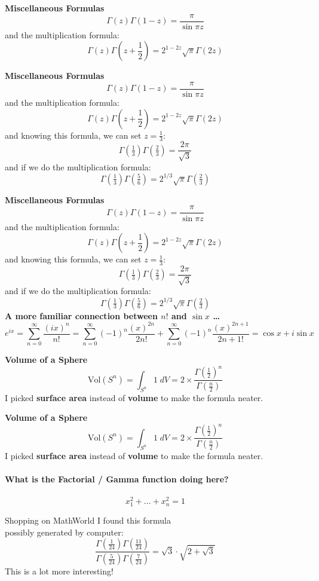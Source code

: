 \documentclass[12pt]{article}
\begin{document}
\newpage

\noindent \textbf{Miscellaneous Formulas}
$$ \Gamma(z) \Gamma(1-z) = \frac{\pi}{\sin \pi z}$$
and the multiplication formula:
$$ \Gamma(z) \Gamma(z+ \frac{1}{2}) = 2^{1-2z} \sqrt{\pi}\Gamma(2z) $$

\newpage

\noindent \textbf{Miscellaneous Formulas}
$$ \Gamma(z) \Gamma(1-z) = \frac{\pi}{\sin \pi z}$$
and the multiplication formula:
$$ \Gamma(z) \Gamma(z+ \frac{1}{2}) = 2^{1-2z} \sqrt{\pi}\Gamma(2z) $$
and knowing this formula, we can set $z = \frac{1}{3}$:
$$ \Gamma(\tfrac{1}{3})\Gamma(\tfrac{2}{3})
= \frac{2\pi}{\sqrt{3}}$$
and if we do the multiplication formula:
$$ \Gamma(\tfrac{1}{3})
\Gamma(\tfrac{5}{6}) = 2^{1/3} \sqrt{\pi} \Gamma(\tfrac{2}{3})$$

\newpage

\noindent \textbf{Miscellaneous Formulas}
$$ \Gamma(z) \Gamma(1-z) = \frac{\pi}{\sin \pi z}$$
and the multiplication formula:
$$ \Gamma(z) \Gamma(z+ \frac{1}{2}) = 2^{1-2z} \sqrt{\pi}\Gamma(2z) $$
and knowing this formula, we can set $z = \frac{1}{3}$:
$$ \Gamma(\tfrac{1}{3})\Gamma(\tfrac{2}{3})
= \frac{2\pi}{\sqrt{3}}$$
and if we do the multiplication formula:
$$ \Gamma(\tfrac{1}{3})
\Gamma(\tfrac{5}{6}) = 2^{1/3} \sqrt{\pi} \Gamma(\tfrac{2}{3})$$
\textbf{A more familiar connection between $n!$ and $\sin x $ \dots}
$$ e^{ix} = \sum_{n=0}^\infty \frac{(ix)^n}{n!} = 
\sum_{n=0}^\infty (-1)^n\frac{(x)^{2n}}{{2n}!} 
+ \sum_{n=0}^\infty (-1)^n\frac{(x)^{2n+1}}{{2n+1}!} = \cos x + i \sin x $$

\newpage

\noindent \textbf{Volume of a Sphere}
$$ \mathrm{Vol}(S^n) =  \int_{S^n} 1 \; dV = 2 \times \frac{\Gamma(\frac{1}{2})^n}{ \Gamma(\frac{n}{2})} $$
I picked \textbf{surface area} instead of \textbf{volume} to make the formula neater.  

\newpage

\noindent \textbf{Volume of a Sphere}
$$ \mathrm{Vol}(S^n) =  \int_{S^n} 1 \; dV = 2 \times \frac{\Gamma(\frac{1}{2})^n}{ \Gamma(\frac{n}{2})} $$
I picked \textbf{surface area} instead of \textbf{volume} to make the formula neater. \\ \\
\textbf{What is the Factorial / Gamma function doing here?} \\ \\
$$ x_1^2 +  \dots +  x_n^2 = 1$$ 

\newpage

\noindent Shopping on MathWorld I found this formula \\ possibly generated by computer:
$$\frac{\Gamma(\frac{1}{24})\Gamma(\frac{11}{24})}{\Gamma(\frac{5}{24})\Gamma(\frac{7}{24})} = \sqrt{3}\cdot  \sqrt{2 + \sqrt{3}} $$
This is a lot more interesting!
\end{document}

